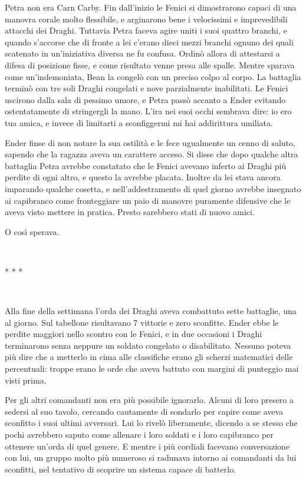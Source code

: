 {Petra non era Carn Carby. Fin dall'inizio le Fenici si dimostrarono
	capaci di una manovra corale molto flessibile, e arginarono bene i
	velocissimi e imprevedibili attacchi dei Draghi. Tuttavia Petra faceva
	agire uniti i suoi quattro branchi, e quando s'accorse che di fronte a
	lei c'erano dieci mezzi branchi ognuno dei quali scatenato in
	un'iniziativa diversa ne fu confusa. Ordinò allora di attestarsi a
	difesa di posizione fisse, e come risultato venne presa alle spalle.
	Mentre sparava come un'indemoniata, Bean la congelò con un preciso colpo
	al corpo. La battaglia terminò con tre soli Draghi congelati e nove
	parzialmente inabilitati. Le Fenici uscirono dalla sala di pessimo
	umore, e Petra passò accanto a Ender evitando ostentatamente di
	stringergli la mano. L'ira nei suoi occhi sembrava dire: io ero tua
	amica, e invece di limitarti a sconfiggermi mi hai addirittura
	umiliata.}

{Ender finse di non notare la sua ostilità e le fece ugualmente un cenno
	di saluto, sapendo che la ragazza aveva un carattere acceso. Si disse
	che dopo qualche altra battaglia Petra avrebbe constatato che le Fenici
	avevano inferto ai Draghi più perdite di ogni altro, e questo la avrebbe
	placata. Inoltre da lei stava ancora imparando qualche cosetta, e
	nell'addestramento di quel giorno avrebbe insegnato ai capibranco come
	fronteggiare un paio di manovre puramente difensive che le aveva visto
	mettere in pratica. Presto sarebbero stati di nuovo amici.}

{O così sperava.}

{~}

\begin{center}
	{* * *}
\end{center}

{~}

{Alla fine della settimana l'orda dei Draghi aveva combattuto sette
	battaglie, una al giorno. Sul tabellone risultavano 7 vittorie e zero
	sconfitte. Ender ebbe le perdite maggiori nello scontro con le Fenici, e
	in due occasioni i Draghi terminarono senza neppure un soldato congelato
	o disabilitato. Nessuno poteva più dire che a metterlo in cima alle
	classifiche erano gli scherzi matematici delle percentuali: troppe erano
	le orde che aveva battuto con margini di punteggio mai visti prima.}

{Per gli altri comandanti non era più possibile ignorarlo. Alcuni di
	loro presero a sedersi al suo tavolo, cercando cautamente di sondarlo
	per capire come aveva sconfitto i suoi ultimi avversari. Lui lo rivelò
	liberamente, dicendo a se stesso che pochi avrebbero saputo come
	allenare i loro soldati e i loro capibranco per ottenere un'orda di quel
	genere. E mentre i più cordiali facevano conversazione con lui, un
	gruppo molto più numeroso si radunava intorno ai comandanti da lui
	sconfitti, nel tentativo di scoprire un sistema capace di batterlo.}

